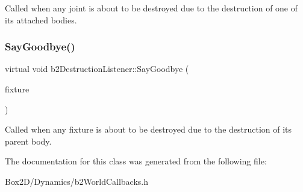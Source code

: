 Called when any joint is about to be destroyed due to the destruction of one of its attached bodies. \mbox{\label{classb2_destruction_listener_ab327c0073d162112c38d2fe8f8b9fce3}} 
\subsubsection{\texorpdfstring{Say\+Goodbye()}{SayGoodbye()}\hspace{0.1cm}{\footnotesize\ttfamily [2/2]}}
{\footnotesize\ttfamily virtual void b2\+Destruction\+Listener\+::\+Say\+Goodbye (\begin{DoxyParamCaption}\item[{\hyperlink{classb2_fixture}{b2\+Fixture} $\ast$}]{fixture }\end{DoxyParamCaption})\hspace{0.3cm}{\ttfamily [pure virtual]}}

Called when any fixture is about to be destroyed due to the destruction of its parent body. 

The documentation for this class was generated from the following file\+:\begin{DoxyCompactItemize}
\item 
Box2\+D/\+Dynamics/b2\+World\+Callbacks.\+h\end{DoxyCompactItemize}

